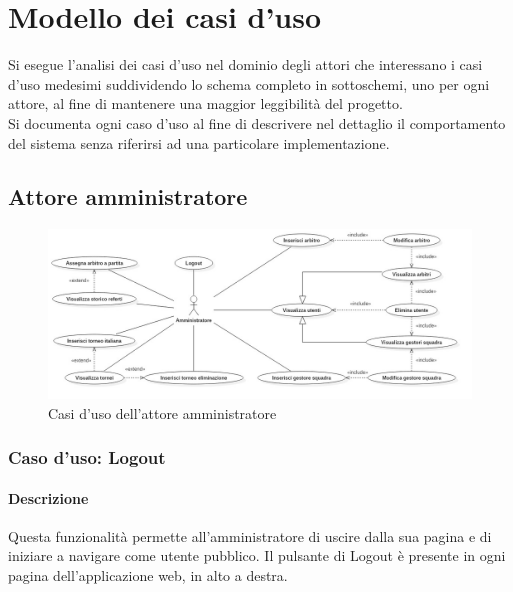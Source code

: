 
\chapter{Modello dei casi d'uso}
\label{cap:modello-casi-d'uso}

Si esegue l'analisi dei casi d'uso nel dominio degli attori che interessano i casi d'uso medesimi suddividendo lo schema completo in sottoschemi, uno per ogni attore, al fine di mantenere una maggior leggibilità del progetto. \\
Si documenta ogni caso d'uso al fine di descrivere nel dettaglio il comportamento del sistema senza riferirsi ad una particolare implementazione.

\section{Attore amministratore}
%
%
\begin{figure}[h]
	\centering
	\includegraphics[width=1\textwidth]
	{immagini/uc-amministratore}
	
	\caption{Casi d'uso dell'attore amministratore}
\end{figure}

%
%
\subsection{Caso d'uso: Logout}

\subsubsection*{Descrizione}
Questa funzionalità permette all'amministratore di uscire dalla sua pagina e di iniziare a navigare come utente pubblico.
Il pulsante di Logout è presente in ogni pagina dell'applicazione web, in alto a destra.

